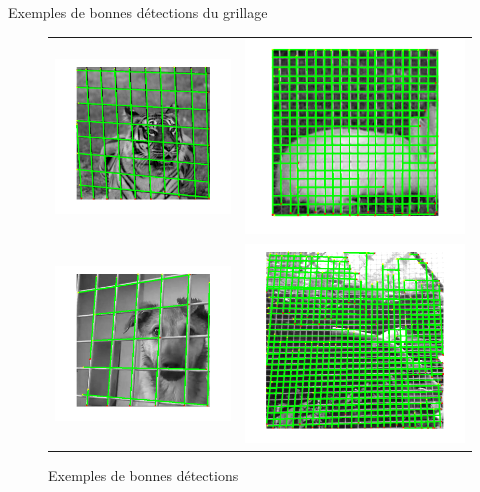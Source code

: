 \begin{frame}{Exemples de bonnes détections du grillage}
\begin{figure}
\begin{center}
\begin{tabular}{cc}
\includegraphics[width = 0.25 \columnwidth]{fig/tigrehough.png}& 
\includegraphics[width = 0.25 \columnwidth]{fig/lapinraff.png}\\
\includegraphics[width = 0.25 \columnwidth]{fig/chiensraff.png}&
\includegraphics[width = 0.25 \columnwidth]{fig/toucanraff.png}
\end{tabular}
\caption{Exemples de bonnes détections}

\end{center}
\end{figure}

\end{frame}

